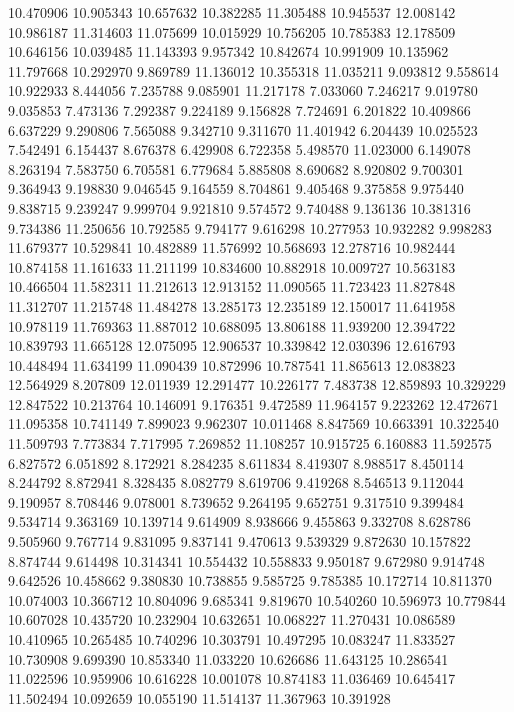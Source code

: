 10.470906
10.905343
10.657632
10.382285
11.305488
10.945537
12.008142
10.986187
11.314603
11.075699
10.015929
10.756205
10.785383
12.178509
10.646156
10.039485
11.143393
9.957342
10.842674
10.991909
10.135962
11.797668
10.292970
9.869789
11.136012
10.355318
11.035211
9.093812
9.558614
10.922933
8.444056
7.235788
9.085901
11.217178
7.033060
7.246217
9.019780
9.035853
7.473136
7.292387
9.224189
9.156828
7.724691
6.201822
10.409866
6.637229
9.290806
7.565088
9.342710
9.311670
11.401942
6.204439
10.025523
7.542491
6.154437
8.676378
6.429908
6.722358
5.498570
11.023000
6.149078
8.263194
7.583750
6.705581
6.779684
5.885808
8.690682
8.920802
9.700301
9.364943
9.198830
9.046545
9.164559
8.704861
9.405468
9.375858
9.975440
9.838715
9.239247
9.999704
9.921810
9.574572
9.740488
9.136136
10.381316
9.734386
11.250656
10.792585
9.794177
9.616298
10.277953
10.932282
9.998283
11.679377
10.529841
10.482889
11.576992
10.568693
12.278716
10.982444
10.874158
11.161633
11.211199
10.834600
10.882918
10.009727
10.563183
10.466504
11.582311
11.212613
12.913152
11.090565
11.723423
11.827848
11.312707
11.215748
11.484278
13.285173
12.235189
12.150017
11.641958
10.978119
11.769363
11.887012
10.688095
13.806188
11.939200
12.394722
10.839793
11.665128
12.075095
12.906537
10.339842
12.030396
12.616793
10.448494
11.634199
11.090439
10.872996
10.787541
11.865613
12.083823
12.564929
8.207809
12.011939
12.291477
10.226177
7.483738
12.859893
10.329229
12.847522
10.213764
10.146091
9.176351
9.472589
11.964157
9.223262
12.472671
11.095358
10.741149
7.899023
9.962307
10.011468
8.847569
10.663391
10.322540
11.509793
7.773834
7.717995
7.269852
11.108257
10.915725
6.160883
11.592575
6.827572
6.051892
8.172921
8.284235
8.611834
8.419307
8.988517
8.450114
8.244792
8.872941
8.328435
8.082779
8.619706
9.419268
8.546513
9.112044
9.190957
8.708446
9.078001
8.739652
9.264195
9.652751
9.317510
9.399484
9.534714
9.363169
10.139714
9.614909
8.938666
9.455863
9.332708
8.628786
9.505960
9.767714
9.831095
9.837141
9.470613
9.539329
9.872630
10.157822
8.874744
9.614498
10.314341
10.554432
10.558833
9.950187
9.672980
9.914748
9.642526
10.458662
9.380830
10.738855
9.585725
9.785385
10.172714
10.811370
10.074003
10.366712
10.804096
9.685341
9.819670
10.540260
10.596973
10.779844
10.607028
10.435720
10.232904
10.632651
10.068227
11.270431
10.086589
10.410965
10.265485
10.740296
10.303791
10.497295
10.083247
11.833527
10.730908
9.699390
10.853340
11.033220
10.626686
11.643125
10.286541
11.022596
10.959906
10.616228
10.001078
10.874183
11.036469
10.645417
11.502494
10.092659
10.055190
11.514137
11.367963
10.391928
